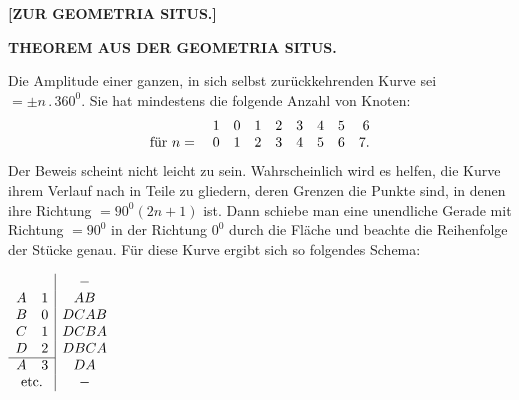 \begin{center}
{\Large\bfseries{}}\par\medskip
[I.]

\bigskip \textbf{[ZUR GEOMETRIA SITUS.]}

\bigskip [1.]

\medskip \textbf{THEOREM AUS DER GEOMETRIA SITUS.}
\end{center}

Die Amplitude einer ganzen, in sich selbst zurückkehrenden Kurve sei
$=\pm n\,.\,360^0$. Sie hat mindestens die folgende Anzahl von Knoten:
\[
\begin{array}{r@{\quad}rrrrrrrr}
&1&0&1&2&3&4&5&6\\
\text{für }n={}&0&1&2&3&4&5&6&7.
\end{array}
\]
Der Beweis scheint nicht leicht zu sein. Wahrscheinlich wird es helfen, die Kurve ihrem Verlauf nach in Teile zu gliedern, deren Grenzen die Punkte sind, in denen ihre Richtung $=90^0(2n+1)$ ist. Dann schiebe man eine unendliche Gerade mit Richtung $=90^0$ in der Richtung $0^0$ durch die Fläche und beachte die Reihenfolge der Stücke genau. Für diese Kurve ergibt sich so folgendes Schema:

\begin{center}
\begin{minipage}{8cm}\centering

\end{minipage}\hfill
\begin{minipage}{3.8cm}\centering
$\begin{array}{cc|c}
&&-\\
A&1&AB\\
B&0&DCAB\\
C&1&DCBA\\
D&2&DBCA\\ \cline{1-2}
A&3&DA\\
\multicolumn{2}{c|}{\text{etc.}}&-
\end{array}$
\end{minipage}
\end{center}
